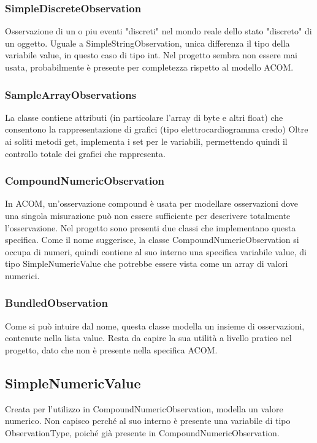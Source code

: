 \documentclass[a4paper]{article}
\begin{document}
        \subsubsection{SimpleDiscreteObservation}
            Osservazione di un o piu eventi "discreti" nel mondo reale dello stato "discreto" di un oggetto.
            Uguale a SimpleStringObservation, unica differenza il tipo della variabile value, in questo caso di tipo int.
            Nel progetto sembra non essere mai usata, probabilmente è presente per completezza rispetto al modello ACOM.
        \subsubsection{SampleArrayObservations}
            La classe contiene attributi (in particolare l'array di byte e altri float) che consentono la rappresentazione di grafici (tipo elettrocardiogramma credo)
            Oltre ai soliti metodi get, implementa i set per le variabili, permettendo quindi il controllo totale dei grafici che rappresenta.
        \subsubsection{CompoundNumericObservation}
            In ACOM, un'osservazione compound è usata per modellare osservazioni dove una singola misurazione può non essere sufficiente per
            descrivere totalmente l'osservazione.
            Nel progetto sono presenti due classi che implementano questa specifica.
            Come il nome suggerisce, la classe CompoundNumericObservation si occupa di numeri, quindi contiene al suo interno una specifica variabile value, di tipo SimpleNumericValue
            che potrebbe essere vista come un array di valori numerici.
        \subsubsection{BundledObservation}
            Come si può intuire dal nome, questa classe modella un insieme di osservazioni, contenute nella lista value.
            Resta da capire la sua utilità a livello pratico nel progetto, dato che non è presente nella specifica ACOM.
            \subsection{SimpleNumericValue}
            Creata per l'utilizzo in CompoundNumericObservation, modella un valore numerico. Non capisco perché al suo interno è presente
            una variabile di tipo ObservationType, poiché già presente in CompoundNumericObservation. 
\end{document}
